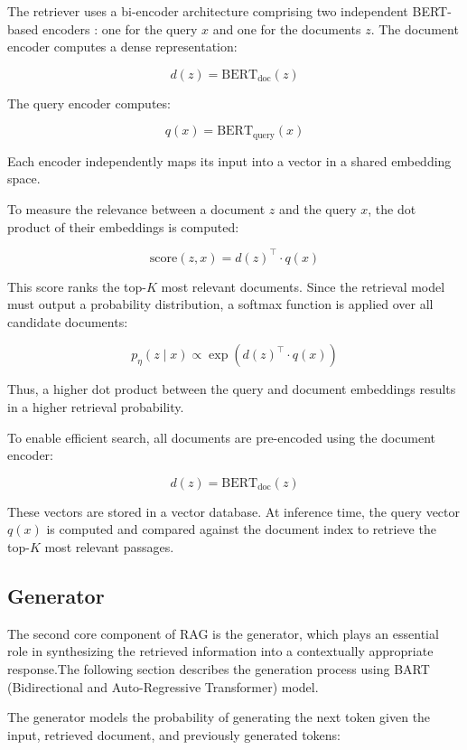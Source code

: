 \documentclass[%
    paper=A4,                    %
    twoside=true,               %
    openright,                  %
    parskip=full,               %
    chapterprefix=true,         %
    11pt,                       %
    headings=normal,            %
    bibliography=totoc,         %
    listof=totoc,              %
    titlepage=on,              %
    captions=tableabove,        %
    draft=false,               %
]{scrreprt}%
\begin{document}
The retriever uses a bi-encoder architecture comprising two independent BERT-based encoders \cite{devlin-etal-2019-bert}: one for the query \( x \) and one for the documents \( z \). The document encoder computes a dense representation:

\[
d(z) = \text{BERT}_{\text{doc}}(z)
\]

The query encoder computes:

\[
q(x) = \text{BERT}_{\text{query}}(x)
\]

Each encoder independently maps its input into a vector in a shared embedding space.

To measure the relevance between a document \( z \) and the query \( x \), the dot product of their embeddings is computed:

\[
\text{score}(z, x) = d(z)^\top \cdot q(x)
\]

This score ranks the top-\( K \) most relevant documents. Since the retrieval model must output a probability distribution, a softmax function is applied over all candidate documents:

\[
p_\eta(z \mid x) \propto \exp\left(d(z)^\top \cdot q(x)\right)
\]

Thus, a higher dot product between the query and document embeddings results in a higher retrieval probability.

To enable efficient search, all documents are pre-encoded using the document encoder:

\[
d(z) = \text{BERT}_{\text{doc}}(z)
\]

These vectors are stored in a vector database. At inference time, the query vector \( q(x) \) is computed and compared against the document index to retrieve the top-\( K \) most relevant passages.





\subsection{Generator}

The second core component of RAG is the generator, which plays an essential role in synthesizing the retrieved information into a contextually appropriate response.The following section describes the generation process using BART (Bidirectional and Auto-Regressive Transformer) model\cite{lewis-etal-2020-bart}.

The generator models the probability of generating the next token given the input, retrieved document, and previously generated tokens:
\end{document}
